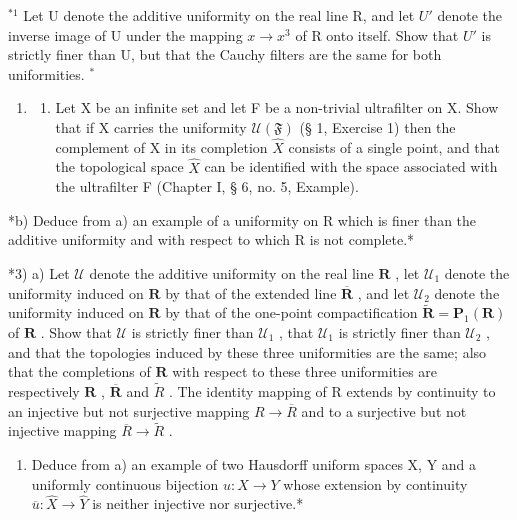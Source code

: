 \BourbakiExerciseGroup

\(^{*1}\) Let U denote the additive uniformity on the real line R, and let \(U'\) denote the inverse image of U under the mapping \(x \rightarrow x^{3}\) of R onto itself. Show that \(U'\) is strictly finer than U, but that the Cauchy filters are the same for both uniformities. \(^{*}\)

\begin{enumerate}
\def\labelenumi{\arabic{enumi})}
\setcounter{enumi}{1}
\tightlist
\item
  \begin{enumerate}
  \def\labelenumii{\alph{enumii})}
  \tightlist
  \item
    Let X be an infinite set and let F be a non-trivial ultrafilter on X. Show that if X carries the uniformity \(\mathcal{U}(\mathfrak{F})\) (§ 1, Exercise 1) then the complement of X in its completion \(\hat{X}\) consists of a single point, and that the topological space \(\hat{X}\) can be identified with the space associated with the ultrafilter F (Chapter I, § 6, no. 5, Example).
  \end{enumerate}
\end{enumerate}

*b) Deduce from a) an example of a uniformity on R which is finer than the additive uniformity and with respect to which R is not complete.*

*3) a) Let \(\mathcal{U}\) denote the additive uniformity on the real line \(\mathbf{R}\) , let \(\mathcal{U}_1\) denote the uniformity induced on \(\mathbf{R}\) by that of the extended line \(\overline{\mathbf{R}}\) , and let \(\mathcal{U}_2\) denote the uniformity induced on \(\mathbf{R}\) by that of the one-point compactification \(\tilde{\mathbf{R}} = \mathbf{P}_1(\mathbf{R})\) of \(\mathbf{R}\) . Show that \(\mathcal{U}\) is strictly finer than \(\mathcal{U}_1\) , that \(\mathcal{U}_1\) is strictly finer than \(\mathcal{U}_2\) , and that the topologies induced by these three uniformities are the same; also that the completions of \(\mathbf{R}\) with respect to these three uniformities are respectively \(\mathbf{R}\) , \(\overline{\mathbf{R}}\) and \(\tilde{R}\) . The identity mapping of R extends by continuity to an injective but not surjective mapping \(R \rightarrow \overline{R}\) and to a surjective but not injective mapping \(\overline{R} \rightarrow \tilde{R}\) .

\begin{enumerate}
\def\labelenumi{\alph{enumi})}
\setcounter{enumi}{1}
\tightlist
\item
  Deduce from a) an example of two Hausdorff uniform spaces X, Y and a uniformly continuous bijection \(u: X \rightarrow Y\) whose extension by continuity \(\overline{u}: \hat{X} \rightarrow \hat{Y}\) is neither injective nor surjective.*
\end{enumerate}


